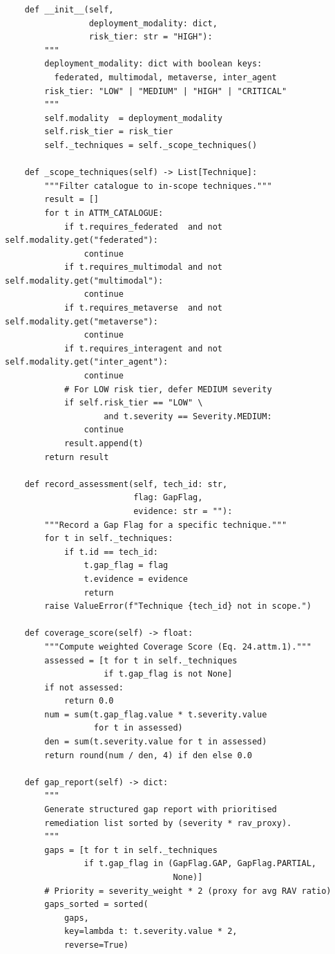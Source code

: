 \begin{lstlisting}
    def __init__(self,
                 deployment_modality: dict,
                 risk_tier: str = "HIGH"):
        """
        deployment_modality: dict with boolean keys:
          federated, multimodal, metaverse, inter_agent
        risk_tier: "LOW" | "MEDIUM" | "HIGH" | "CRITICAL"
        """
        self.modality  = deployment_modality
        self.risk_tier = risk_tier
        self._techniques = self._scope_techniques()

    def _scope_techniques(self) -> List[Technique]:
        """Filter catalogue to in-scope techniques."""
        result = []
        for t in ATTM_CATALOGUE:
            if t.requires_federated  and not self.modality.get("federated"):
                continue
            if t.requires_multimodal and not self.modality.get("multimodal"):
                continue
            if t.requires_metaverse  and not self.modality.get("metaverse"):
                continue
            if t.requires_interagent and not self.modality.get("inter_agent"):
                continue
            # For LOW risk tier, defer MEDIUM severity
            if self.risk_tier == "LOW" \
                    and t.severity == Severity.MEDIUM:
                continue
            result.append(t)
        return result

    def record_assessment(self, tech_id: str,
                          flag: GapFlag,
                          evidence: str = ""):
        """Record a Gap Flag for a specific technique."""
        for t in self._techniques:
            if t.id == tech_id:
                t.gap_flag = flag
                t.evidence = evidence
                return
        raise ValueError(f"Technique {tech_id} not in scope.")

    def coverage_score(self) -> float:
        """Compute weighted Coverage Score (Eq. 24.attm.1)."""
        assessed = [t for t in self._techniques
                    if t.gap_flag is not None]
        if not assessed:
            return 0.0
        num = sum(t.gap_flag.value * t.severity.value
                  for t in assessed)
        den = sum(t.severity.value for t in assessed)
        return round(num / den, 4) if den else 0.0

    def gap_report(self) -> dict:
        """
        Generate structured gap report with prioritised
        remediation list sorted by (severity * rav_proxy).
        """
        gaps = [t for t in self._techniques
                if t.gap_flag in (GapFlag.GAP, GapFlag.PARTIAL,
                                  None)]
        # Priority = severity_weight * 2 (proxy for avg RAV ratio)
        gaps_sorted = sorted(
            gaps,
            key=lambda t: t.severity.value * 2,
            reverse=True)


\end{lstlisting}
